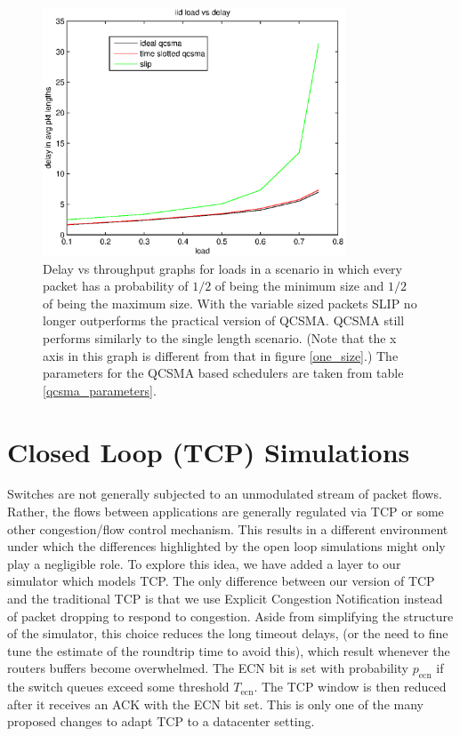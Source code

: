 \documentclass[11pt]{article}%
\begin{document}
\begin{figure}
\center
	 \includegraphics[width=90mm]{vs_load.eps}
	 \caption{Delay vs throughput graphs for loads in a scenario in which every packet has a probability of $1/2$ of being the minimum size and $1/2$ of being the maximum size. With the variable sized packets SLIP no longer outperforms the practical version of QCSMA.  QCSMA still performs similarly to the single length scenario.  (Note that the x axis in this graph is different from that in figure \ref{one_size}.) The parameters for the QCSMA based schedulers are taken from table \ref{qcsma_parameters}.} 	
	\label{variable_size}
\end{figure}

\section{Closed Loop (TCP) Simulations} \label{closed}


Switches are not generally subjected to an unmodulated stream of packet flows.  Rather, the flows between applications are generally regulated via TCP or some other congestion/flow control mechanism.  This results in a different environment under which the differences highlighted by the open loop simulations might only play a negligible role.  To explore this idea, we have added a layer to our simulator which models TCP.  The only difference between our version of TCP and the traditional TCP is that we use Explicit Congestion Notification instead of packet dropping to respond to congestion.  Aside from simplifying the structure of the simulator, this choice reduces the long timeout delays, (or the need to fine tune the estimate of the roundtrip time to avoid this), which result whenever the routers buffers become overwhelmed.  The ECN bit is set with probability $p_{\text{ecn}}$ if the switch queues exceed some threshold $T_{\text{ecn}}$.  The TCP window is then reduced after it receives an ACK with the ECN bit set.  This is only one of the many proposed changes to adapt TCP to a datacenter setting.
\end{document}
